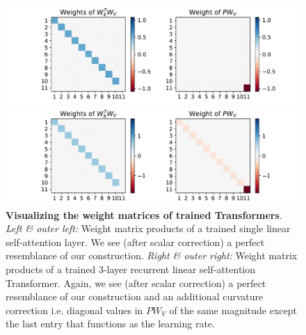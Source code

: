 \documentclass{article}
\theoremstyle{plain}
\theoremstyle{definition}
\theoremstyle{remark}
\begin{document}
\begin{figure}
\centering
\begin{minipage}{.52\textwidth}
  \centering
  \begin{center}
    \includegraphics[width=1.\textwidth]{Final_figures/weight_vis/weight_vis.pdf}
  \end{center}
\end{minipage}
 \hspace{-40pt}
\begin{minipage}{.52\textwidth}
  \centering
  \begin{center}
    \includegraphics[width=1.\textwidth]{Final_figures/weight_vis/weight_vis_2.pdf}
  \end{center}
\end{minipage}
\hspace{-0pt}
  \caption{\textbf{Visualizing the weight matrices of trained Transformers}. \textit{Left \& outer left:} Weight matrix products of a trained single linear self-attention layer. We see (after scalar correction) a perfect resemblance of our construction. \textit{Right \& outer right:} Weight matrix products of a trained 3-layer recurrent linear self-attention Transformer. Again, we see (after scalar correction) a perfect resemblance of our construction and an additional curvature correction i.e. diagonal values in $PW_V$ of the same magnitude except the last entry that functions as the learning rate.}
  \label{fig:weight_vis}
  \vspace{-10pt}
\end{figure}
\end{document}
